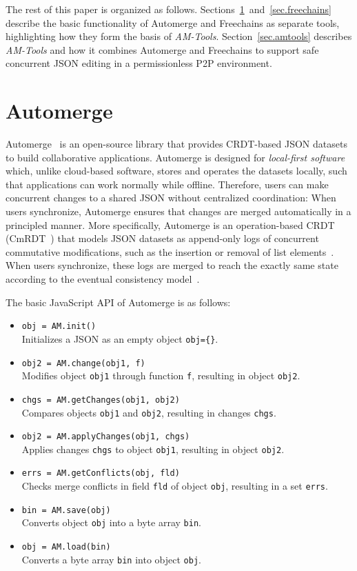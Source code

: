 \documentclass[12pt]{article}
\newcommand{\AMT}      {\emph{AM-Tools}\xspace}
\newcommand{\code}[1]  {\texttt{\footnotesize{#1}}}
\begin{document}
The rest of this paper is organized as follows.
Sections~\ref{sec.automerge}~and~\ref{sec.freechains} describe the basic
functionality of Automerge and Freechains as separate tools, highlighting how
they form the basis of \AMT.
Section~\ref{sec.amtools} describes \AMT and how it combines Automerge and
Freechains to support safe concurrent JSON editing in a permissionless P2P
environment.

\section{Automerge}
\label{sec.automerge}

Automerge~\cite{p2p.automerge} is an open-source library that provides
CRDT-based JSON datasets to build collaborative applications.
%
Automerge is designed for \emph{local-first software}~\cite{p2p.local} which,
unlike cloud-based software, stores and operates the datasets locally, such
that applications can work normally while offline.
%
Therefore, users can make concurrent changes to a shared JSON without
centralized coordination:
When users synchronize, Automerge ensures that changes are merged automatically
in a principled manner.
%
More specifically, Automerge is an operation-based CRDT
(CmRDT~\cite{p2p.crdts}) that models JSON datasets as append-only logs of
concurrent commutative modifications, such as the insertion or removal of list
elements~\cite{p2p.automerge}.
%
When users synchronize, these logs are merged to reach the exactly same state
according to the eventual consistency model~\cite{p2p.sec}.

The basic JavaScript API of Automerge is as follows:

\begin{itemize}
\item \code{obj = AM.init()} \\
    Initializes a JSON as an empty object \code{obj=\{\}}.
\item \code{obj2 = AM.change(obj1, f)} \\
    Modifies object \code{obj1} through function \code{f}, resulting in
    object \code{obj2}.
\item \code{chgs = AM.getChanges(obj1, obj2)} \\
    Compares objects \code{obj1} and \code{obj2}, resulting in changes
    \code{chgs}.
\item \code{obj2 = AM.applyChanges(obj1, chgs)} \\
    Applies changes \code{chgs} to object \code{obj1}, resulting in object
    \code{obj2}.
\item \code{errs = AM.getConflicts(obj, fld)} \\
    Checks merge conflicts in field \code{fld} of object \code{obj}, resulting
    in a set \code{errs}.
\item \code{bin = AM.save(obj)} \\
    Converts object \code{obj} into a byte array \code{bin}.
\item \code{obj = AM.load(bin)} \\
    Converts a byte array \code{bin} into object \code{obj}.
\end{itemize}
\end{document}
